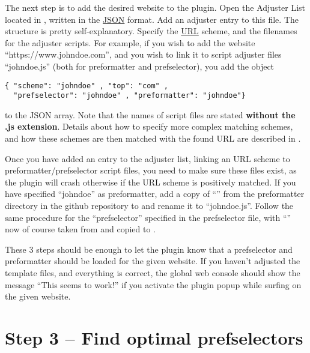\documentclass[
a4paper,
12pt,
]
{article}
\begin{document}
The next step is to add the desired website to the plugin. Open the Adjuster List located in
, 
written in the \href{https://en.wikipedia.org/wiki/JSON}{JSON} format. Add an adjuster entry to this file. The structure is pretty self-explanatory. Specify the \href{https://en.wikipedia.org/wiki/URL}{URL} scheme, and the filenames for the adjuster scripts. For example, if you wish to add the website ``https://www.johndoe.com'', and you wish to link it to script adjuster files ``johndoe.js'' (both for preformatter and prefselector), you add the object
\begin{center}
\begin{lstlisting}
{ "scheme": "johndoe" , "top": "com" ,
  "prefselector": "johndoe" , "preformatter": "johndoe"}
\end{lstlisting}
\end{center}
to the JSON array. Note that the names of script files are stated \textbf{without the .js extension}. Details about how to specify more complex matching schemes, and how these schemes are then matched with the found URL are described in .\par

Once you have added an entry to the adjuster list, linking an URL scheme to preformatter/prefselector script files, you need to make sure these files exist, as the plugin will crash otherwise if the URL scheme is positively matched. If you have specified ``johndoe'' as preformatter, add a copy of ``\tmpl'' from the preformatter directory in the github repository 
to 
and rename it to ``johndoe.js''. Follow the same procedure for the ``prefselector'' specified in the  prefselector file, with ``\tmpl'' now of course taken from 
and copied to
.

These 3 steps should be enough to let the plugin know that a prefselector and preformatter should be loaded for the given website. If you haven't adjusted the template files, and everything is correct, the global web console should show the message ``This seems to work!'' if you activate the plugin popup while surfing on the given website.
% 
\section{Step 3 -- Find optimal prefselectors}\label{sec_3}
 
\end{document}
